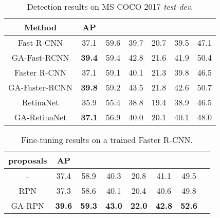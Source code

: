 \documentclass[10pt,twocolumn,letterpaper]{article}
\begin{document}
\begin{table}[t]
	\centering
	\caption{\small{Detection results on MS COCO 2017 \emph{test-dev}.}}
	\addtolength{\tabcolsep}{-2pt}
	\small{
		\begin{tabular}{*{7}{c}}
			\toprule
			Method         & AP            &  &  &  &  &  \\
			\midrule
			Fast R-CNN     & 37.1          & 59.6             & 39.7             & 20.7            & 39.5            & 47.1            \\
			GA-Fast-RCNN   & \textbf{39.4} & 59.4             & 42.8             & 21.6            & 41.9            & 50.4            \\
			\midrule
			Faster R-CNN   & 37.1          & 59.1             & 40.1             & 21.3            & 39.8            & 46.5            \\
			GA-Faster-RCNN & \textbf{39.8} & 59.2             & 43.5             & 21.8            & 42.6            & 50.7            \\
			\midrule
			RetinaNet      & 35.9          & 55.4             & 38.8             & 19.4            & 38.9            & 46.5            \\
			GA-RetinaNet   & \textbf{37.1} & 56.9             & 40.0             & 20.1            & 40.1            & 48.0            \\
			\bottomrule
		\end{tabular}
	}
	\vspace{-10pt}
	\label{tab:det-results}
\end{table}

\begin{table}[h]
	\centering
	\caption{\small{Fine-tuning results on a trained Faster R-CNN.}}
	\addtolength{\tabcolsep}{-2pt}
	\small{
		\begin{tabular}{*{8}{c}}
			\toprule
			proposals & AP            &  &  &  &  &  \\
			\midrule
			-         & 37.4          & 58.9             & 40.3             & 20.8            & 41.1            & 49.5            \\
			RPN       & 37.3          & 58.6             & 40.1             & 20.4            & 40.6            & 49.8            \\
			GA-RPN    & \textbf{39.6} & \textbf{59.3}    & \textbf{43.0}    & \textbf{22.0}   & \textbf{42.8}   & \textbf{52.6}   \\
			\bottomrule
		\end{tabular}
	}
	\label{tab:finetune}
	\vspace{-10pt}
\end{table}
\end{document}
